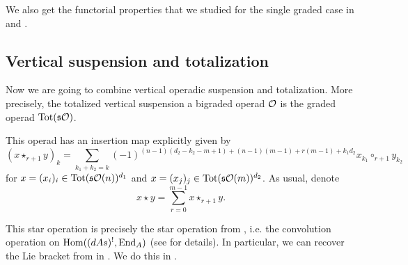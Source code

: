 \documentclass[join.tex]{subfiles}
\begin{document}
We also get the functorial properties that we studied for the single graded case in  and .

\subsection{Vertical suspension and totalization} 

Now we are going to combine vertical operadic suspension and totalization. More precisely, the totalized vertical suspension a bigraded operad ${\mathcal O}$ is the graded operad $\mathrm{Tot}(\mathfrak{s}{\mathcal O})$. 


This operad has an insertion map explicitly given by
\begin{equation}\label{star}
(x\star_{r+1} y)_k=\sum_{k_1+k_2=k}(-1)^{(n-1)(d_2-k_2-m+1)+(n-1)(m-1)+r(m-1)+k_1d_2}x_{k_1}\circ_{r+1}y_{k_2}
\end{equation}
for $x=(x_i)_i\in \mathrm{Tot}(\mathfrak{s}{\mathcal O}(n))^{d_1}$ and $x=(x_j)_j\in \mathrm{Tot}(\mathfrak{s}{\mathcal O}(m))^{d_2}$. As usual, denote \[x\star y=\sum_{r=0}^{m-1}x\star_{r+1}y.\]

This star operation is precisely the star operation from \cite[\S 5.1]{LRW}, i.e. the convolution operation on $\operatorname{Hom}((dAs)^{!}, \operatorname{End}_A)$ (see \cite{LRW} for details). In particular, we can recover the Lie bracket from in \cite{LRW}. We do this in .


\end{document}
